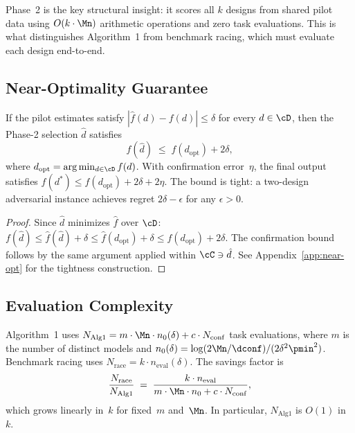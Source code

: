 Phase~2 is the key structural insight: it scores all $k$ designs from
shared pilot data using $O(k \cdot \Mn)$ arithmetic operations and zero
task evaluations.  This is what distinguishes Algorithm~1 from benchmark
racing, which must evaluate each design end-to-end.

\subsection{Near-Optimality Guarantee}

\begin{proposition}
\label{prop:near-opt}
If the pilot estimates satisfy $|\hat{f}(d) - f(d)| \le \delta$ for every
$d \in \cD$, then the Phase-2 selection $\hat{d}$ satisfies
\begin{equation}
\label{eq:near-opt}
  f(\hat{d}) \;\le\; f(d_{\mathrm{opt}}) + 2\delta,
\end{equation}
where $d_{\mathrm{opt}} = \arg\min_{d \in \cD} f(d)$.
With confirmation error~$\eta$, the final output satisfies
$f(d^*) \le f(d_{\mathrm{opt}}) + 2\delta + 2\eta$.
The bound is tight: a two-design adversarial instance achieves
regret $2\delta - \epsilon$ for any $\epsilon > 0$.
\end{proposition}

\begin{proof}
Since $\hat{d}$ minimizes $\hat{f}$ over $\cD$:
$f(\hat{d}) \le \hat{f}(\hat{d}) + \delta
\le \hat{f}(d_{\mathrm{opt}}) + \delta
\le f(d_{\mathrm{opt}}) + 2\delta$.
The confirmation bound follows by the same argument applied within
$\cC \ni \hat{d}$.  See Appendix~\ref{app:near-opt} for the tightness
construction.
\end{proof}

\subsection{Evaluation Complexity}

\begin{proposition}
\label{prop:eval-complexity}
Algorithm~1 uses
$N_{\mathrm{Alg1}} = m \cdot \Mn \cdot n_0(\delta) + c \cdot N_{\mathrm{conf}}$
task evaluations, where $m$ is the number of distinct models and
$n_0(\delta) = \log(2\Mn/\dconf) / (2\delta^2 \pmin^2)$.
Benchmark racing uses $N_{\mathrm{race}} = k \cdot n_{\mathrm{eval}}(\delta)$.
The savings factor is
\begin{equation}
\label{eq:savings}
  \frac{N_{\mathrm{race}}}{N_{\mathrm{Alg1}}}
  \;=\; \frac{k \cdot n_{\mathrm{eval}}}{m \cdot \Mn \cdot n_0 + c \cdot N_{\mathrm{conf}}},
\end{equation}
which grows linearly in~$k$ for fixed~$m$ and~$\Mn$.
In particular, $N_{\mathrm{Alg1}}$ is $O(1)$ in~$k$.
\end{proposition}

